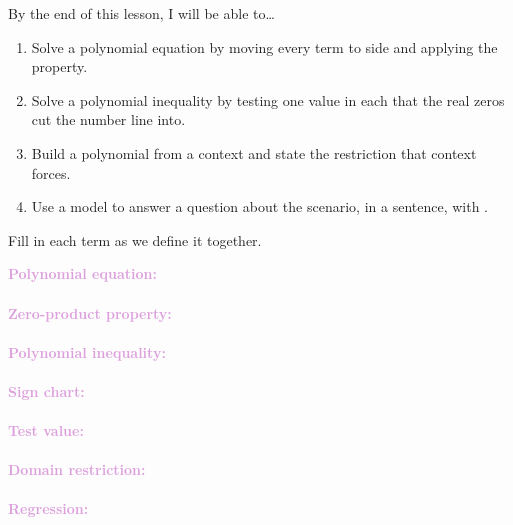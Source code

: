 \documentclass[10pt]{article}
\begin{document}

\vspace{0.12in}

\begin{objectivebox}
By the end of this lesson, I will be able to\ldots
\begin{enumerate}[itemsep=2pt]
  \item Solve a polynomial equation by moving every term to 
        side and applying the  property.
  \item Solve a polynomial inequality by testing one value in each
         that the real zeros cut the number line into.
  \item Build a polynomial  from a context and state the
         restriction that context forces.
  \item Use a model to answer a question about the scenario, in a sentence,
        with .
\end{enumerate}
\end{objectivebox}

\vspace{0.1in}

\boxguard
\begin{vocabbox}
Fill in each term as we define it together.
\par\vspace{2pt}
\noindent\textbf{\textcolor{plum}{Polynomial equation:}}\\[1pt]
\\[3pt]
\noindent\textbf{\textcolor{plum}{Zero-product property:}}\\[1pt]
\\[3pt]
\noindent\textbf{\textcolor{plum}{Polynomial inequality:}}\\[1pt]
\\[3pt]
\noindent\textbf{\textcolor{plum}{Sign chart:}}\\[1pt]
\\[3pt]
\noindent\textbf{\textcolor{plum}{Test value:}}\\[1pt]
\\[3pt]
\noindent\textbf{\textcolor{plum}{Domain restriction:}}\\[1pt]
\\[3pt]
\noindent\textbf{\textcolor{plum}{Regression:}}\\[1pt]
\end{vocabbox}
\end{document}
